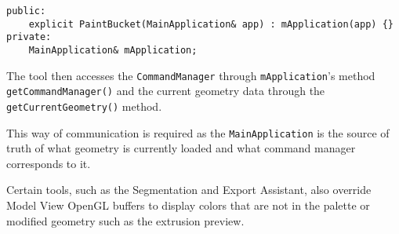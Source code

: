 \begin{lstlisting}
public:
	explicit PaintBucket(MainApplication& app) : mApplication(app) {}
private:
	MainApplication& mApplication;
\end{lstlisting}

The tool then accesses the \texttt{CommandManager} through \texttt{mApplication}'s method \texttt{getCommandManager()} and the current geometry data through the \texttt{getCurrentGeometry()} method.

This way of communication is required as the \texttt{MainApplication} is the source of truth of what geometry is currently loaded and what command manager corresponds to it.

Certain tools, such as the Segmentation and Export Assistant, also override Model View OpenGL buffers to display colors that are not in the palette or modified geometry such as the extrusion preview.